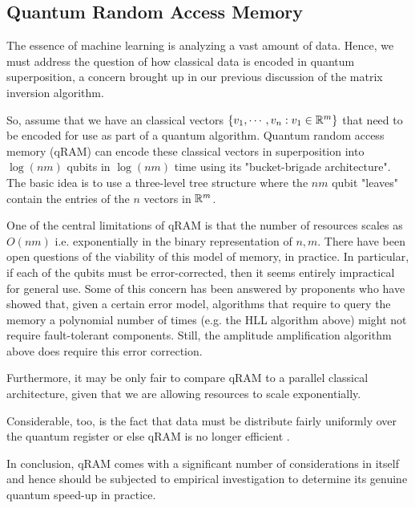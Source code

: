 \documentclass[main.tex]{subfiles}
\begin{document}
\subsection{Quantum Random Access Memory} 

The essence of machine learning is analyzing a vast amount of data. Hence, we must address the question of how classical data is encoded in quantum superposition, a concern brought up in our previous discussion of the matrix inversion algorithm. 

So, assume that we have an classical vectors $\{v_1, \cdots , v_ n : v_1 \in \mathbb{R}^m \}$ that need to be encoded for use as part of a quantum algorithm. Quantum random access memory (qRAM) can encode these classical vectors in superposition into $\log(nm)$ qubits in $\log(nm)$ time using its "bucket-brigade architecture"\cite{giovannetti2008quantum}. The basic idea is to use a three-level tree structure where the $nm$ qubit "leaves" contain the entries of the $n$ vectors in $\mathbb{R}^m$.

One of the central limitations of qRAM is that the number of resources scales as $O(nm)$ i.e. exponentially in the binary representation of $n, m$. There have been open questions of the viability of this model of memory, in practice. In particular, if each of the qubits must be error-corrected, then it seems entirely impractical for general use. Some of this concern has been answered by proponents who have showed that, given a certain error model, algorithms that require to query the memory a polynomial number of times (e.g. the HLL algorithm above) might not require fault-tolerant components. Still, the amplitude amplification algorithm above does require this error correction. 

Furthermore, it may be only fair to compare qRAM to a parallel classical architecture, given that we are allowing resources to scale exponentially. 

Considerable, too, is the fact that data must be distribute fairly uniformly over the quantum register or else qRAM is no longer efficient \cite{aaronson2015read}. 

In conclusion, qRAM comes with a significant number of considerations in itself and hence should be subjected to empirical investigation to determine its genuine quantum speed-up in practice. 

\end{document}
